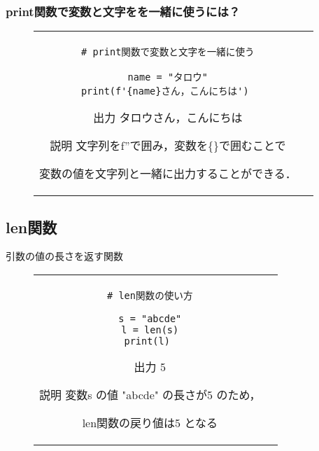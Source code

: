 \documentclass{jsarticle}
\begin{document}
\subsubsection{print関数で変数と文字をを一緒に使うには？} \vspace{-5mm}
\begin{figure}[h]
	\begin{tabular}{cc}
		\begin{minipage}[t]{.4\textwidth}
			\begin{lstlisting}[caption=print関数]
# print関数で変数と文字を一緒に使う

name = "タロウ"
print(f'{name}さん，こんにちは') \end{lstlisting}
		\end{minipage} \hspace{5mm}
		\begin{minipage}[t]{.5\textwidth}
			\begin{minipage}[t]{.6\textwidth}
				\begin{itembox}[l]{出力}
					タロウさん，こんにちは
				\end{itembox}
			\end{minipage}
			\begin{itembox}[l]{説明}
				文字列をf''で囲み，変数を\{\}で囲むことで \par
				変数の値を文字列と一緒に出力することができる．
			\end{itembox}
		\end{minipage}
	\end{tabular}
\end{figure}

\newpage
\subsection{len関数}
引数の値の長さを返す関数 \vspace{-5mm}
\begin{figure}[h]
	\begin{tabular}{cc}
		\begin{minipage}[t]{.4\textwidth}
			\begin{lstlisting}[caption=len関数]
# len関数の使い方

s = "abcde"
l = len(s)
print(l) \end{lstlisting}
		\end{minipage} \hspace{5mm}
		\begin{minipage}[t]{.4\textwidth}
			\begin{minipage}[t]{.25\textwidth}
				\begin{itembox}[l]{出力}
					5
				\end{itembox}
			\end{minipage}
			\begin{itembox}[l]{説明}
				変数s の値 "abcde" の長さが5 のため， \par
				len関数の戻り値は5 となる
			\end{itembox}
		\end{minipage}
	\end{tabular}
\end{figure}
\end{document}
